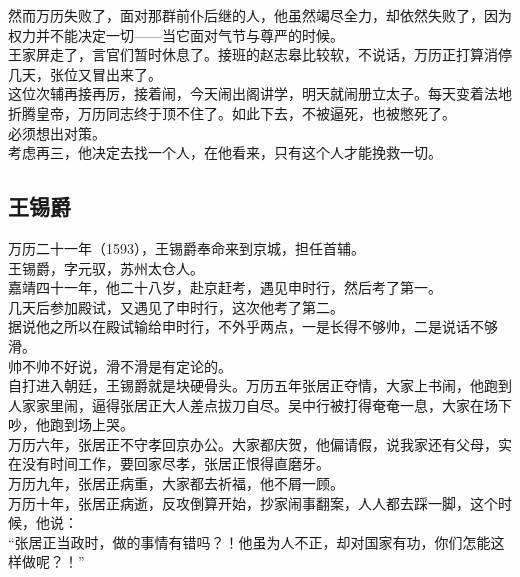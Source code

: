 \begin{multicols}{\theparacolNo}
然而万历失败了，面对那群前仆后继的人，他虽然竭尽全力，却依然失败了，因为权力并不能决定一切——当它面对气节与尊严的时候。\\

王家屏走了，言官们暂时休息了。接班的赵志皋比较软，不说话，万历正打算消停几天，张位又冒出来了。\\

这位次辅再接再厉，接着闹，今天闹出阁讲学，明天就闹册立太子。每天变着法地折腾皇帝，万历同志终于顶不住了。如此下去，不被逼死，也被憋死了。\\

必须想出对策。\\

考虑再三，他决定去找一个人，在他看来，只有这个人才能挽救一切。\\

\subsection{王锡爵}
万历二十一年（1593），王锡爵奉命来到京城，担任首辅。\\

王锡爵，字元驭，苏州太仓人。\\

嘉靖四十一年，他二十八岁，赴京赶考，遇见申时行，然后考了第一。\\

几天后参加殿试，又遇见了申时行，这次他考了第二。\\

据说他之所以在殿试输给申时行，不外乎两点，一是长得不够帅，二是说话不够滑。\\

帅不帅不好说，滑不滑是有定论的。\\

自打进入朝廷，王锡爵就是块硬骨头。万历五年张居正夺情，大家上书闹，他跑到人家家里闹，逼得张居正大人差点拔刀自尽。吴中行被打得奄奄一息，大家在场下吵，他跑到场上哭。\\

万历六年，张居正不守孝回京办公。大家都庆贺，他偏请假，说我家还有父母，实在没有时间工作，要回家尽孝，张居正恨得直磨牙。\\

万历九年，张居正病重，大家都去祈福，他不屑一顾。\\

万历十年，张居正病逝，反攻倒算开始，抄家闹事翻案，人人都去踩一脚，这个时候，他说：\\

“张居正当政时，做的事情有错吗？！他虽为人不正，却对国家有功，你们怎能这样做呢？！”\\


\end{multicols}
